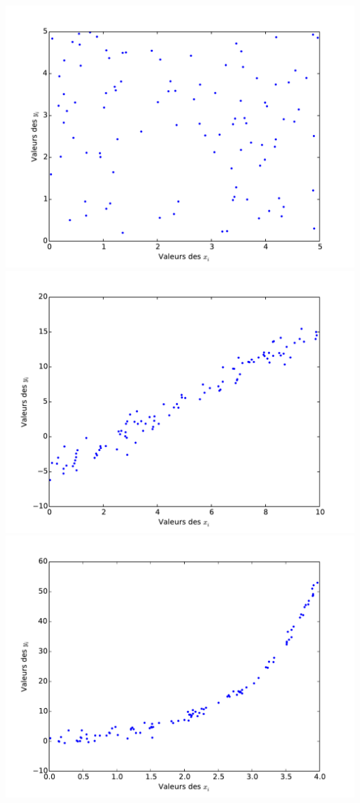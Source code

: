 \begin{center}
\includegraphics[scale=0.3]{Dessin/Y_Xind.pdf}
\includegraphics[scale=0.3]{Dessin/XY_lin.pdf}\\
\includegraphics[scale=0.3]{Dessin/Y_expX.pdf}

\end{center}
